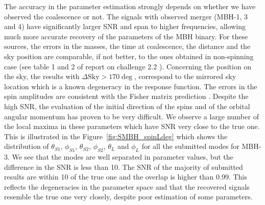 \documentclass{iopart}
\begin{document}
The accuracy in the parameter estimation strongly depends on whether we have observed the coalescence or not.
The signals with observed merger (MBH-1, 3 and 4) have significantly larger SNR and span to higher frequencies, 
allowing much more accurate recovery of the parameters of the MBH binary. 
 For these sources, the errors in the masses, the time at coalescence, the distance and the sky position are comparable, if not better, to the ones obtained in non-spinning case (see table 1 and 2 of report on challenge 2.2 \cite{MLDC2Res}). Concerning the position on the sky, the results with  $\Delta \textrm{Sky} > 170 \deg$, correspond to the mirrored sky location which is a known degeneracy in the response function. The errors in the spin amplitudes
  are consistent with the Fisher matrix prediction \cite{SpinBBHLangHugues}.  Despite the high SNR, the evaluation of the initial direction of the spins and of the orbital angular momentum has proven to be very difficult.  We observe a large number of the local maxima in these parameters which have SNR very close to the true one. This is illustrated in the Figure~\ref{fig:SMBH_spinLdeg} which shows the distribution of $\theta_{S1}$, $\phi_{S1}$, $\theta_{S2}$, $\phi_{S2}$, $\theta_{L}$ and $\phi_{L}$ for all the submitted modes for MBH-3. We see that the modes are well separated in parameter values, but the difference in the SNR is less than 10. The SNR of the majority of submitted results are within 10 of the true one and the overlap is higher than 0.99.
This reflects the degeneracies in the parameter space and that the recovered signals resemble the true one very closely, despite poor estimation of some parameters.
\end{document}
